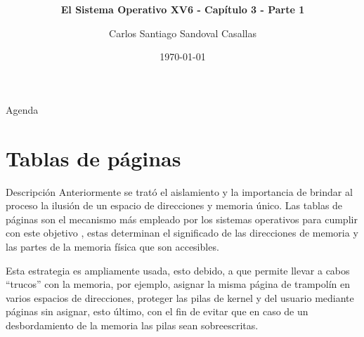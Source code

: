 \documentclass{libs/ufc_format}
\title[Sistemas Operativos]{\huge\textbf{}}
\subtitle{\textbf{El Sistema Operativo XV6 - Capítulo 3 - Parte 1}}
\author{Carlos Santiago Sandoval Casallas}
\institute[UNAL]{
    \normalsize{\email{csandovalc@unal.edu.co}}
    \newline
    \department{Departamento de Ingeniería de Sistemas e Industrial}
    \newline
    \ufc
}
\date{\today}
\begin{document}


\begin{frame}
    \maketitle
\end{frame}

\begin{frame}{Agenda}
        \tableofcontents
\end{frame}
\section{Tablas de páginas}
\begin{frame}{Descripción}
    Anteriormente se trató el aislamiento y la importancia de brindar al proceso la ilusión de un espacio de direcciones y memoria único. Las tablas de páginas son el mecanismo más empleado por los sistemas operativos para cumplir con este objetivo \cite{xv6_book}, estas determinan el significado de las direcciones de memoria y las partes de la memoria física que son accesibles.

    \vspace{0.3cm}

    Esta estrategia es ampliamente usada, esto debido, a que permite llevar a cabos “trucos” con la memoria, por ejemplo, asignar la misma página de trampolín en varios espacios de direcciones, proteger las pilas de kernel y del usuario mediante páginas sin asignar, esto último, con el fin de evitar que en caso de un desbordamiento de la memoria las pilas sean sobreescritas.
\end{frame}
\end{document}
